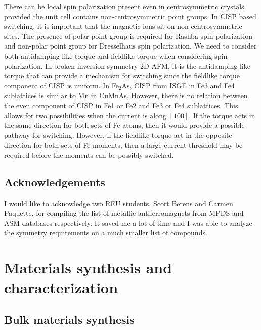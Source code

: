 \documentclass[10pt,doublespacing,edeposit]{uiucthesis2020}
\begin{document}
\begin{mainmatter}
There can be local spin polarization present even in centrosymmetric crystals provided the unit cell contains non-centrosymmetric point groups. In CISP based switching, it is important that the magnetic ions sit on non-centrosymmetric sites. The presence of polar point group is required for Rashba spin polarization and non-polar point group for Dresselhaus spin polarization. We need to consider both antidamping-like torque and fieldlike torque when considering spin polarization. In broken inversion symmetry 2D AFM, it is the antidamping-like torque that can provide a mechanism for switching since the fieldlike torque component of CISP is uniform. In Fe$_2$As, CISP from ISGE in Fe3 and Fe4 sublattices is similar to Mn in CuMnAs. However, there is no relation between the even component of CISP in Fe1 or Fe2 and Fe3 or Fe4 sublattices. This allows for two possibilities when the current is along $[100]$. If the torque acts in the same direction for both sets of Fe atoms, then it would provide a possible pathway for switching. However, if the fieldlike torque act in the opposite direction for both sets of Fe moments, then a large current threshold may be required before the moments can be possibly switched.

\section{Acknowledgements}


I would like to acknowledge two REU students, Scott Berens and Carmen Paquette, for compiling the list of metallic antiferromagnets from MPDS and ASM databases respectively. It saved me a lot of time and I was able to analyze the symmetry requirements on a much smaller list of compounds.





\chapter{Materials synthesis and characterization}

\section{Bulk materials synthesis}



\end{mainmatter}
\end{document}
